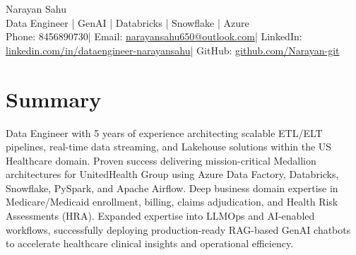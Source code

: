 \documentclass[a4paper,8pt]{article}
\begin{document}
\begin{center}
\begin{minipage}{1\textwidth}
\centering
\textcolor[HTML]{1C033C}{\LARGE Narayan Sahu} \\[3pt]
\textcolor[HTML]{4B28A4}{\large Data Engineer | GenAI | Databricks | Snowflake | Azure} \\[2pt]

{\footnotesize
\setlength{\spaceskip}{0pt} %
\textcolor[HTML]{371e77}{
    Phone: 8456890730\hspace{0.3em}|\hspace{0.2em}
    Email: \href{mailto:narayansahu650@outlook.com}{narayansahu650@outlook.com}\hspace{0.3em}|\hspace{0.2em}
    LinkedIn: \href{https://www.linkedin.com/in/dataengineer-narayansahu/}{linkedin.com/in/dataengineer-narayansahu}\hspace{0.3em}|\hspace{0.2em}
    GitHub: \href{https://github.com/Narayan-git/Data_Engineering}{github.com/Narayan-git}
}
}
\end{minipage}
\end{center}


\section{Summary}
\vspace{0.2cm}
\color[HTML]{1C033C}\begin{flushleft} Data Engineer with 5 years of experience architecting scalable ETL/ELT pipelines, real-time data streaming, and Lakehouse solutions within the US Healthcare domain. Proven success delivering mission-critical Medallion architectures for UnitedHealth Group using Azure Data Factory, Databricks, Snowflake, PySpark, and Apache Airflow. Deep business domain expertise in Medicare/Medicaid enrollment, billing, claims adjudication, and Health Risk Assessments (HRA). Expanded expertise into LLMOps and AI-enabled workflows, successfully deploying production-ready RAG-based GenAI chatbots to accelerate healthcare clinical insights and operational efficiency.
\end{flushleft}
\end{document}
